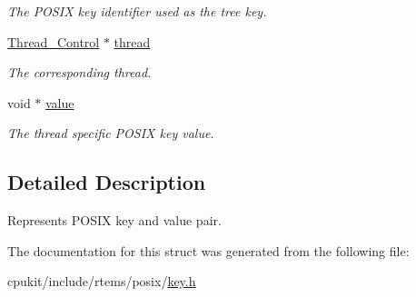 \begin{DoxyCompactItemize}
\begin{DoxyCompactList}\small\item\em The P\+O\+S\+IX key identifier used as the tree key. \end{DoxyCompactList}\item 
\mbox{\label{structPOSIX__Keys__Key__value__pair_ae3dcdaec623a7a23048b9f9a5fea02b4}} 
\mbox{\hyperlink{struct__Thread__Control}{Thread\+\_\+\+Control}} $\ast$ \mbox{\hyperlink{structPOSIX__Keys__Key__value__pair_ae3dcdaec623a7a23048b9f9a5fea02b4}{thread}}
\begin{DoxyCompactList}\small\item\em The corresponding thread. \end{DoxyCompactList}\item 
\mbox{\label{structPOSIX__Keys__Key__value__pair_ac08eeb178f5760f6bf691a80069cfba5}} 
void $\ast$ \mbox{\hyperlink{structPOSIX__Keys__Key__value__pair_ac08eeb178f5760f6bf691a80069cfba5}{value}}
\begin{DoxyCompactList}\small\item\em The thread specific P\+O\+S\+IX key value. \end{DoxyCompactList}\end{DoxyCompactItemize}


\subsection{Detailed Description}
Represents P\+O\+S\+IX key and value pair. 

The documentation for this struct was generated from the following file\+:\begin{DoxyCompactItemize}
\item 
cpukit/include/rtems/posix/\mbox{\hyperlink{key_8h}{key.\+h}}\end{DoxyCompactItemize}
